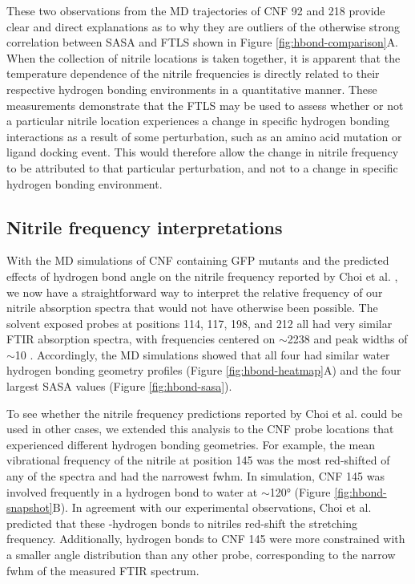 These two observations from the MD trajectories of CNF 92 and 218 provide clear and direct explanations as to why they are outliers of the otherwise strong correlation between SASA and FTLS shown in Figure \ref{fig:hbond-comparison}A.
When the collection of nitrile locations is taken together, it is apparent that the temperature dependence of the nitrile frequencies is directly related to their respective hydrogen bonding environments in a quantitative manner.
These measurements demonstrate that the FTLS may be used to assess whether or not a particular nitrile location experiences a change in specific hydrogen bonding interactions as a result of some perturbation, such as an amino acid mutation or ligand docking event.
This would therefore allow the change in nitrile frequency to be attributed to that particular perturbation, and not to a change in specific hydrogen bonding environment.

\subsection{Nitrile frequency interpretations}

With the MD simulations of CNF containing GFP mutants and the predicted effects of hydrogen bond angle on the nitrile frequency reported by Choi et al. \cite{Choi2008}, we now have a straightforward way to interpret the relative frequency of our nitrile absorption spectra that would not have otherwise been possible.
The solvent exposed probes at positions 114, 117, 198, and 212 all had very similar FTIR absorption spectra, with frequencies centered on $\sim$2238 \si{\wn} and peak widths of $\sim$10 \si{\wn}.
Accordingly, the MD simulations showed that all four had similar water hydrogen bonding geometry profiles (Figure \ref{fig:hbond-heatmap}A) and the four largest SASA values (Figure \ref{fig:hbond-sasa}).

To see whether the nitrile frequency predictions reported by Choi et al. could be used in other cases, we extended this analysis to the CNF probe locations that experienced different hydrogen bonding geometries.
For example, the mean vibrational frequency of the nitrile at position 145 was the most red-shifted of any of the spectra and had the narrowest fwhm.
In simulation, CNF 145 was involved frequently in a hydrogen bond to water at $\sim$\ang{120} (Figure \ref{fig:hbond-snapshot}B).
In agreement with our experimental observations, Choi et al. predicted that these \textpi{}-hydrogen bonds to nitriles red-shift the stretching frequency.
Additionally, hydrogen bonds to CNF 145 were more constrained with a smaller angle distribution than any other probe, corresponding to the narrow fwhm of the measured FTIR spectrum. 

